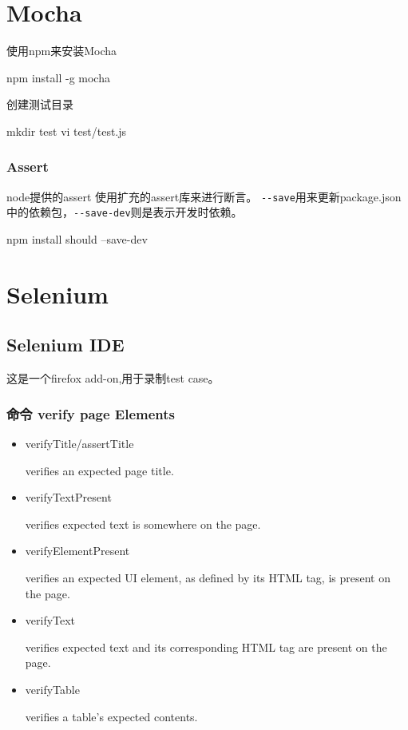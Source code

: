 \chapter{Mocha}

使用npm来安装Mocha
\begin{Bash}
npm install -g mocha
\end{Bash}
创建测试目录
\begin{Bash}
mkdir test
vi test/test.js
\end{Bash}

\subsection{Assert}
node提供的assert
使用扩充的assert库来进行断言。 \lstinline!--save!用来更新package.json中的依赖包，\lstinline!--save-dev!则是表示开发时依赖。
\begin{Bash}
npm install should --save-dev
\end{Bash}


\chapter{Selenium}

\section{Selenium IDE}
这是一个firefox add-on,用于录制test case。

\subsection{命令 verify page Elements}
\begin{itemize}
\item verifyTitle/assertTitle

verifies an expected page title.

\item verifyTextPresent

verifies expected text is somewhere on the page.

\item verifyElementPresent

verifies an expected UI element, as defined by its HTML tag, is present on the page.

\item verifyText

verifies expected text and its corresponding HTML tag are present on the page.

\item verifyTable

verifies a table’s expected contents.
\end{itemize}





